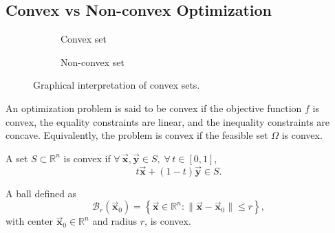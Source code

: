 \documentclass[9pt, headings=standardclasses, parskip=half]{scrartcl}
\renewcommand{\emph}[1]{\textcolor{mypurple}{#1}}
\newcommand{\vect}[1]{\vec{\boldsymbol{#1}}}
\begin{document}
\subsection{Convex vs Non-convex Optimization}

\begin{figure}[h]
\centering
\begin{subfigure}{0.2\textwidth}
    \centering
    \caption*{Convex set}
\end{subfigure}
\begin{subfigure}{0.2\textwidth}
    \centering
    \caption*{Non-convex set}
\end{subfigure}
\caption*{Graphical interpretation of convex sets.}
\label{fig:convexSet}
\end{figure}


An optimization problem is said to be \emph{convex} if the objective function \(f\) is convex, the equality constraints are linear, and the inequality constraints are concave. Equivalently, the problem is convex if the feasible set \(\Omega\) is convex.

\begin{definition}\label{def:convex_set}
A set \(S\subset\mathbb{R}^{n}\) is \emph{convex} if \(\forall\,\vect{x},\vect{y}\in S,\; \forall\, t\in[0,1]\),
\[
t\vect{x}+(1-t)\vect{y}\in S.
\]
\end{definition}

\begin{example}
A ball defined as
\[
\mathcal{B}_{r}(\vect{x}_{0})=\left\{ \vect{x}\in\mathbb{R}^{n} : \|\vect{x}-\vect{x}_{0}\|\leq r \right\},
\]
with center \(\vect{x}_{0}\in\mathbb{R}^{n}\) and radius \(r\), is convex.
\end{example}
\end{document}
